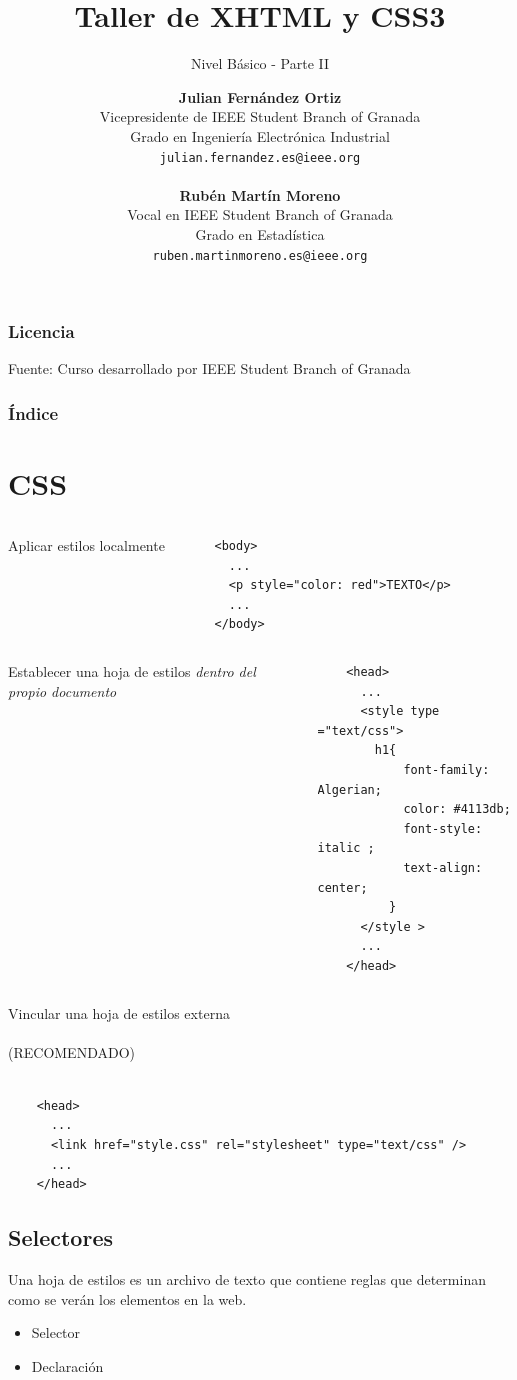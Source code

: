 \documentclass{beamer}
\title[XHTML y CSS]{Taller de XHTML y CSS3}
\subtitle{Nivel Básico - Parte II}
\author[Julián Fernández, Rubén Martín]{
	\textbf{Julian Fernández Ortiz }
	\\
	\medskip
	\scriptsize{
	Vicepresidente de IEEE Student Branch of Granada\\
	Grado en Ingeniería Electrónica Industrial
	}	
	\\	
	\texttt{julian.fernandez.es@ieee.org}
	\\ \ \\
	\small{\textbf{Rubén Martín Moreno}}
	\\
	\medskip
	\scriptsize{
	Vocal en IEEE Student Branch of Granada\\
	Grado en Estadística
	}
	\\
	\texttt{ruben.martinmoreno.es@ieee.org}
}
\date{}
\begin{document}
\frame{\titlepage}

\begin{frame}
\frametitle{Licencia}
\doclicenseThis
Fuente: Curso desarrollado por IEEE Student Branch of Granada
\end{frame}

\begin{frame}
  \frametitle{Índice}
  \tableofcontents
\end{frame}

\section{CSS}
\begin{frame}[fragile]
\begin{columns}[t]
	Aplicar estilos localmente
	\pause
	\scriptsize{
	\begin{verbatim}
	<body>
	  ...
	  <p style="color: red">TEXTO</p>
	  ...
	</body>
	\end{verbatim}
	}
	
\end{columns}
\end{frame}

\begin{frame}[fragile]
\begin{columns}[t]
	Establecer una hoja de estilos \textit{dentro del propio documento}
	\pause
	\scriptsize{
	\begin{verbatim}
	<head>
	  ...
	  <style type ="text/css">
		h1{
			font-family: Algerian;
			color: #4113db; 
			font-style: italic ;
			text-align: center;
		  }
	  </style >
	  ...
	</head>
	\end{verbatim}
	}

\end{columns}
\end{frame}

\begin{frame}[fragile]
	Vincular una hoja de estilos externa\\ \ \\ (RECOMENDADO)
	\\ \ \\
	\pause
	\scriptsize{
	\begin{verbatim}
	<head>
	  ...
	  <link href="style.css" rel="stylesheet" type="text/css" />
	  ...
	</head>
	\end{verbatim}
	}	
\end{frame}
	\subsection{Selectores}
\begin{frame}
	Una hoja de estilos es un archivo de texto que contiene reglas que determinan como se verán los elementos en la web. 
	\pause
	\begin{itemize}
	\item Selector
	\item Declaración
	\end{itemize}
\end{frame}
\end{document}
